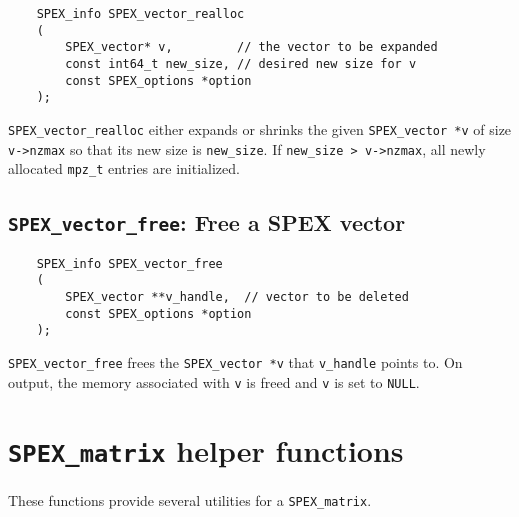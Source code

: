 \documentclass[12pt]{report}
\theoremstyle{definition}
\begin{document}
{\begin{mdframed}[userdefinedwidth=6in]
{\footnotesize
\begin{verbatim}
    SPEX_info SPEX_vector_realloc
    (
        SPEX_vector* v,         // the vector to be expanded
        const int64_t new_size, // desired new size for v
        const SPEX_options *option
    ); 
\end{verbatim}
} \end{mdframed}

\verb|SPEX_vector_realloc| either expands or shrinks the given \verb|SPEX_vector *v| of size \verb|v->nzmax| so that its new size is \verb|new_size|. If \verb|new_size > v->nzmax|, all newly allocated \verb|mpz_t| entries are initialized.

\subsection{\texttt{SPEX\_vector\_free}: Free a SPEX vector} \label{ss:spex_vector_free}

\begin{mdframed}[userdefinedwidth=6in]
{\footnotesize
\begin{verbatim}
    SPEX_info SPEX_vector_free
    (
        SPEX_vector **v_handle,  // vector to be deleted
        const SPEX_options *option
    ); 
\end{verbatim}
} \end{mdframed}

\verb|SPEX_vector_free| frees the \verb|SPEX_vector *v| that \verb|v_handle| points to. On output, the memory associated with \verb|v| is freed and \verb|v| is set to \verb|NULL|.
}
\section{\texttt{SPEX\_matrix} helper functions} \label{s:spex_matrix_functions}

These functions provide several utilities for a \verb|SPEX_matrix|.

\end{document}
